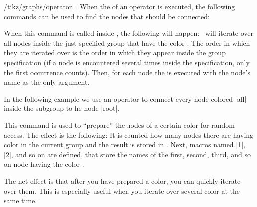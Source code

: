 \begin{key}{/tikz/graphs/operator=}
    When the  of an operator is executed, the following commands can
    be used to find the nodes that should be connected:
    \begin{command}{\tikzgraphforeachcolorednode{}}
        When this command is called inside , the following will
        happen: \tikzname\ will iterate over all nodes inside the
        just-specified group that have the color . The order
        in which they are iterated over is the order in which they appear
        inside the group specification (if a node is encountered several times
        inside the specification, only the first occurrence counts). Then, for
        each node the  is executed with the node's name as the only
        argument.

        In the following example we use an operator to connect every node
        colored |all| inside the subgroup to he node |root|.
\begin{codeexample}[preamble={\usetikzlibrary{graphs}}]
\def\myconnect#1{\tikzset{graphs/new ->={root}{#1}{}{}}}

\end{codeexample}
    \end{command}

    \begin{command}{\tikzgraphpreparecolor{}}
        This command is used to ``prepare'' the nodes of a certain color for
        random access. The effect is the following: It is counted how many
        nodes there are having color  in the current group and
        the result is stored in . Next, macros named
        |1|, |2|, and so on are defined, that store
        the names of the first, second, third, and so on node having the color
        .

        The net effect is that after you have prepared a color, you can quickly
        iterate over them. This is especially useful when you iterate over
        several color at the same time.


\end{command}
\end{key}
